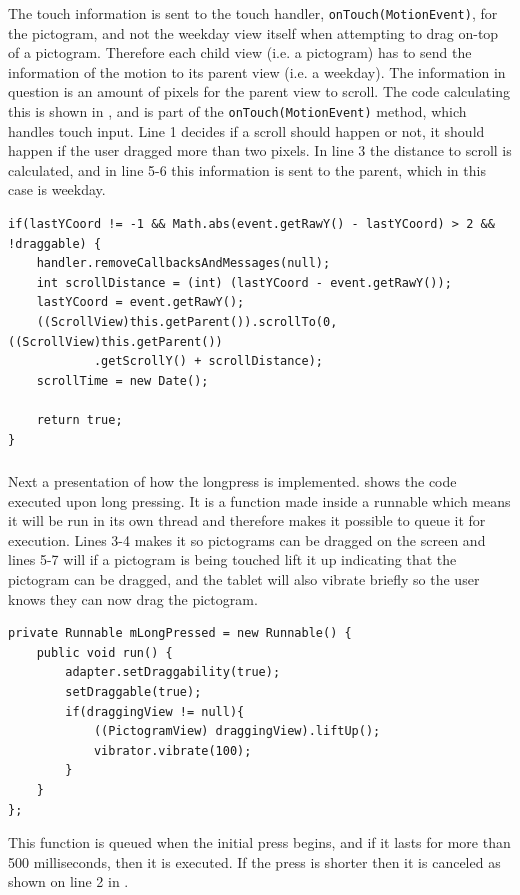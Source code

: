 The touch information is sent to the touch handler, \texttt{onTouch(MotionEvent)}, for the pictogram, and not the weekday view itself when attempting to drag on-top of a pictogram. 
Therefore each child view (i.e. a pictogram) has to send the information of the motion to its parent view (i.e. a weekday). 
The information in question is an amount of pixels for the parent view to scroll. 
The code calculating this is shown in , and is part of the \texttt{onTouch(MotionEvent)} method, which handles touch input. 
Line 1 decides if a scroll should happen or not, it should happen if the user dragged more than two pixels. 
In line 3 the distance to scroll is calculated, and in line 5-6 this information is sent to the parent, which in this case is weekday.  

\begin{lstlisting}[floatplacement=h, caption={The code executed when someone performs a move action.}, label={lst:actionmove}] 
if(lastYCoord != -1 && Math.abs(event.getRawY() - lastYCoord) > 2 && !draggable) {
    handler.removeCallbacksAndMessages(null);
    int scrollDistance = (int) (lastYCoord - event.getRawY());
    lastYCoord = event.getRawY();
    ((ScrollView)this.getParent()).scrollTo(0,((ScrollView)this.getParent())
    		.getScrollY() + scrollDistance);
	scrollTime = new Date();

	return true;
}
\end{lstlisting}

\subsubsection*{}

Next a presentation of how the longpress is implemented.
 shows the code executed upon long pressing.
It is a function made inside a runnable which means it will be run in its own thread and therefore makes it possible to queue it for execution.
Lines 3-4 makes it so pictograms can be dragged on the screen and lines 5-7 will if a pictogram is being touched lift it up indicating that the pictogram can be dragged, and the tablet will also vibrate briefly so the user knows they can now drag the pictogram.

\begin{lstlisting}[floatplacement=h, caption={The longpress function which is queued upon a \texttt{MotionEvent\_Down}, i.e. a touch.}, label={lst:longpress}] 
private Runnable mLongPressed = new Runnable() {
    public void run() {
        adapter.setDraggability(true);
        setDraggable(true);
        if(draggingView != null){
            ((PictogramView) draggingView).liftUp();
            vibrator.vibrate(100);
        }
    }
};
\end{lstlisting}
This function is queued when the initial press begins, and if it lasts for more than 500 milliseconds, then it is executed. 
If the press is shorter then it is canceled as shown on line 2 in . 


